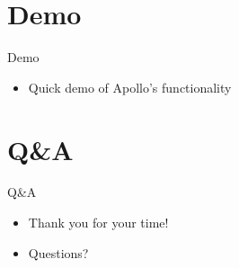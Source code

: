 \documentclass[12pt]{beamer}
\begin{document}
\section{Demo}
\begin{frame}{Demo}
    \begin{itemize}
        \item Quick demo of Apollo's functionality
    \end{itemize}
\end{frame}


\section{Q\&A}
\begin{frame}{Q\&A}
    \begin{itemize}
        \item Thank you for your time!
        \item Questions?
    \end{itemize}
\end{frame}
\end{document}
